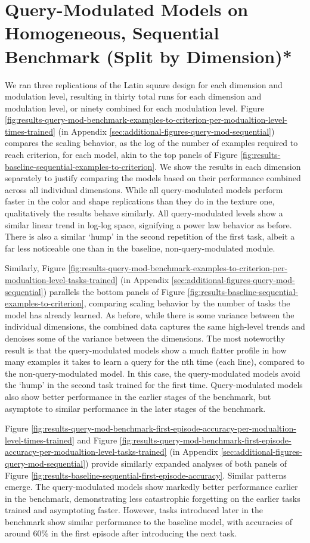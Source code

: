 \FloatBarrier
\section{Query-Modulated Models on Homogeneous, Sequential Benchmark (Split by Dimension)*}
We ran three replications of the Latin square design for each dimension and modulation level, resulting in thirty total runs for each dimension and modulation level, or ninety combined for each modulation level. Figure \ref{fig:results-query-mod-benchmark-examples-to-criterion-per-modualtion-level-times-trained} (in Appendix \ref{sec:additional-figures-query-mod-sequential}) compares the scaling behavior, as the log of the number of examples required to reach criterion, for each model, akin to the top panels of Figure \ref{fig:results-baseline-sequential-examples-to-criterion}. We show the results in each dimension separately to justify comparing the models based on their performance combined across all individual dimensions. While all query-modulated models perform faster in the color and shape replications than they do in the texture one, qualitatively the results behave similarly. All query-modulated levels show a similar linear trend in log-log space, signifying a power law behavior as before. There is also a similar ‘hump’ in the second repetition of the first task, albeit a far less noticeable one than in the baseline, non-query-modulated module. 

Similarly, Figure \ref{fig:results-query-mod-benchmark-examples-to-criterion-per-modualtion-level-tasks-trained} (in Appendix \ref{sec:additional-figures-query-mod-sequential}) parallels the bottom panels of Figure \ref{fig:results-baseline-sequential-examples-to-criterion}, comparing scaling behavior by the number of tasks the model has already learned. As before, while there is some variance between the individual dimensions, the combined data captures the same high-level trends and denoises some of the variance between the dimensions. The most noteworthy result is that the query-modulated models show a much flatter profile in how many examples it takes to learn a query for the nth time (each line), compared to the non-query-modulated model. In this case, the query-modulated models avoid the ‘hump’ in the second task trained for the first time. Query-modulated models also show better performance in the earlier stages of the benchmark, but asymptote to similar performance in the later stages of the benchmark.

Figure \ref{fig:results-query-mod-benchmark-first-episode-accuracy-per-modualtion-level-times-trained} and Figure \ref{fig:results-query-mod-benchmark-first-episode-accuracy-per-modualtion-level-tasks-trained} (in Appendix \ref{sec:additional-figures-query-mod-sequential}) provide similarly expanded analyses of both panels of Figure \ref{fig:results-baseline-sequential-first-episode-accuracy}. Similar patterns emerge. The query-modulated models show markedly better performance earlier in the benchmark, demonstrating less catastrophic forgetting on the earlier tasks trained and asymptoting faster. However, tasks introduced later in the benchmark show similar performance to the baseline model, with accuracies of around 60\% in the first episode after introducing the next task. 